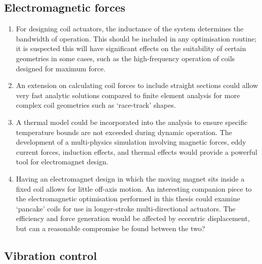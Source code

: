 \documentclass[10pt,a4paper]{memoir}
\begin{document}
\subsection{Electromagnetic forces}

\begin{enumerate}
\item For designing coil actuators, the inductance of the system determines the bandwidth of operation.
This should be included in any optimisation routine; it is suspected this will have significant effects on the suitability of certain geometries in some cases, such as the high-frequency operation of coils designed for maximum force.

\item An extension on calculating coil forces to include straight sections could allow very fast analytic solutions compared to finite element analysis for more complex coil geometries such as `race-track' shapes.

\item A thermal model could be incorporated into the analysis to ensure specific temperature bounds are not exceeded during dynamic operation.
The development of a multi-physics simulation involving magnetic forces, eddy current forces, induction effects, and thermal effects would provide a powerful tool for electromagnet design.

\item Having an electromagnet design in which the moving magnet sits inside a fixed coil allows for little off-axis motion.
An interesting companion piece to the electromagnetic optimisation performed in this thesis could examine `pancake' coils for use in longer-stroke multi-directional actuators.
The efficiency and force generation would be affected by eccentric displacement, but can a reasonable compromise be found between the two?
\end{enumerate}

\subsection{Vibration control}
\end{document}
